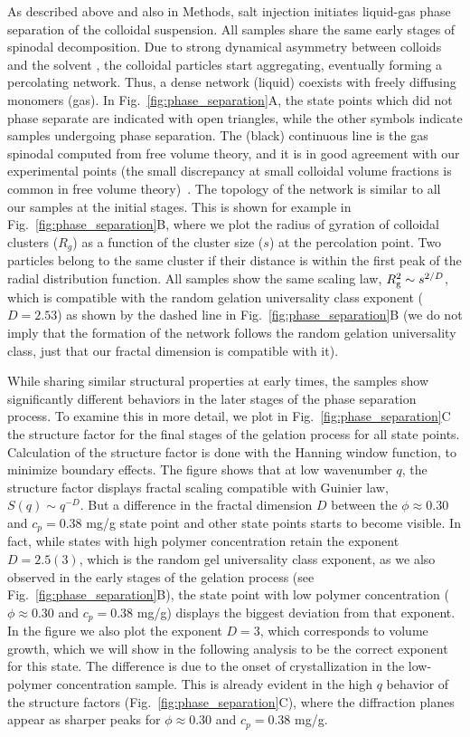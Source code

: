 \documentclass[12pt]{article}
\begin{document}
As described above and also in Methods, salt injection initiates liquid-gas phase separation of the colloidal suspension. 
All samples share the same early stages of spinodal decomposition. 
Due to strong dynamical asymmetry between colloids and the solvent \cite{tanaka1999colloid}, the colloidal particles start aggregating, 
eventually forming a percolating network. Thus, a dense network (liquid) coexists with freely diffusing monomers (gas).
In Fig.~\ref{fig:phase_separation}A, the state points which did not phase separate are indicated with open triangles, while
the other symbols indicate samples undergoing phase separation. The (black) continuous line is the gas spinodal computed from free volume theory,
and it is in good agreement with our experimental points (the small discrepancy at small colloidal volume fractions 
is common in free volume theory)~\cite{Royall2007,lu2008gelation}. 
The topology of the network is similar to all our samples at the initial stages. 
This is shown for example in Fig.~\ref{fig:phase_separation}B, where we plot the radius of gyration of colloidal clusters ($R_g$)
as a function of the cluster size ($s$) at the percolation point. Two particles belong to the same cluster if their distance is
within the first peak of the radial distribution function. All samples show the same scaling law, $R^2_{\rm g}\sim s^{2/D}$, which is compatible with
the random gelation universality class exponent ($D=2.53$) as shown by the dashed line in Fig.~\ref{fig:phase_separation}B
(we do not imply that the formation of the network follows the random gelation universality class, just that our
fractal dimension is compatible with it).

While sharing similar structural properties at early times, the samples show significantly different behaviors in the later stages of the phase separation process.
To examine this in more detail, we plot in Fig.~\ref{fig:phase_separation}C the structure factor for the final stages of the gelation process for all state points.
Calculation of the structure factor is done with the Hanning window function, to minimize boundary effects.
The figure shows that at low wavenumber $q$, the structure factor displays fractal scaling compatible with Guinier law, $S(q)\sim q^{-D}$.
But a difference in the fractal dimension $D$ between the $\phi\approx 0.30$ and $c_p=0.38$ mg/g state point and other state points starts to become visible. In fact, while states
with high polymer concentration retain the exponent $D=2.5(3)$, 
which is the random gel universality class exponent, as we also observed in the early stages of the gelation process (see Fig.~\ref{fig:phase_separation}B),
the state point with low polymer concentration ($\phi\approx 0.30$ and $c_p=0.38$ mg/g) displays the biggest deviation from that exponent. In the figure we also
plot the exponent $D=3$, which corresponds to volume growth, which we will show in the following analysis to be the correct exponent for this state. 
The difference is due to the onset of crystallization in the low-polymer concentration sample. This is already evident in the high $q$ behavior of
the structure factors (Fig.~\ref{fig:phase_separation}C), where the diffraction planes appear as sharper peaks for $\phi\approx 0.30$ and $c_p=0.38$ mg/g.
\end{document}
